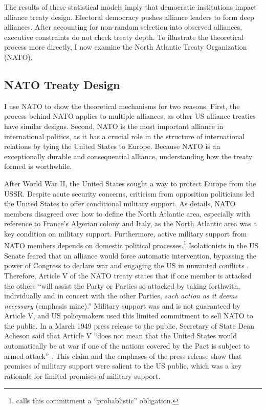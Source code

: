 \documentclass[12pt]{article}
\begin{document}
The results of these statistical models imply that democratic institutions impact alliance treaty design. 
Electoral democracy pushes alliance leaders to form deep alliances. 
After accounting for non-random selection into observed alliances, executive constraints do not check treaty depth. 
To illustrate the theoretical process more directly, I now examine the North Atlantic Treaty Organization (NATO).



\subsection{NATO Treaty Design}


I use NATO to show the theoretical mechanisms for two reasons. 
First, the process behind NATO applies to multiple alliances, as other US alliance treaties have similar designs. 
Second, NATO is the most important alliance in international politics, as it has a crucial role in the structure of international relations by tying the United States to Europe. 
Because NATO is an exceptionally durable and consequential alliance, understanding how the treaty formed is worthwhile. 


After World War II, the United States sought a way to protect Europe from the USSR. 
Despite acute security concerns, criticism from opposition politicians led the United States to offer conditional military support. 
As \citet{Poast2019a} details, NATO members disagreed over how to define the North Atlantic area, especially with reference to France's Algerian colony and Italy, as the North Atlantic area was a key condition on military support. 
Furthermore, active military support from NATO members depends on domestic political processes.\footnote{\citet{Benson2012} calls this commitment a ``probablistic'' obligation.} 
Isolationists in the US Senate feared that an alliance would force automatic intervention, bypassing the power of Congress to declare war and engaging the US in unwanted conflicts \citep[pg. 280-1]{Acheson1969}.
Therefore, Article V of the NATO treaty states that if one member is attacked the others ``will assist the Party or Parties so attacked by taking forthwith, individually and in concert with the other Parties, \emph{such action as it deems necessary} (emphasis mine).'' 
Military support was and is not guaranteed by Article V, and US policymakers used this limited commitment to sell NATO to the public. 
In a March 1949 press release to the public, Secretary of State Dean Acheson said that Article V ``does not mean that the United States would automatically be at war if one of the nations covered by the Pact is subject to armed attack'' \citep{Acheson1949}.
This claim and the emphases of the press release show that promises of military support were salient to the US public, which was a key rationale for limited promises of military support. 
\end{document}
